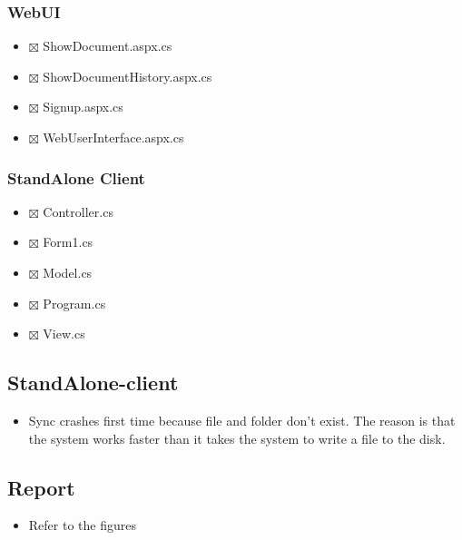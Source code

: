 \documentclass[11pt]{article}
\begin{document}
\subsubsection{WebUI}
\label{sec-1-3-2}

\begin{itemize}
\item $\boxtimes$ ShowDocument.aspx.cs
\item $\boxtimes$ ShowDocumentHistory.aspx.cs
\item $\boxtimes$ Signup.aspx.cs
\item $\boxtimes$ WebUserInterface.aspx.cs
\end{itemize}
\subsubsection{StandAlone Client}
\label{sec-1-3-3}

\begin{itemize}
\item $\boxtimes$ Controller.cs
\item $\boxtimes$ Form1.cs
\item $\boxtimes$ Model.cs
\item $\boxtimes$ Program.cs
\item $\boxtimes$ View.cs
\end{itemize}
\subsection{StandAlone-client}
\label{sec-1-4}

\begin{itemize}
\item Sync crashes first time because file and folder don't exist.
     The reason is that the system works faster than it takes the system to write a 
     file to the disk.
\end{itemize}
\subsection{Report}
\label{sec-1-5}

\begin{itemize}
\item Refer to the figures
\end{itemize}
\end{document}
